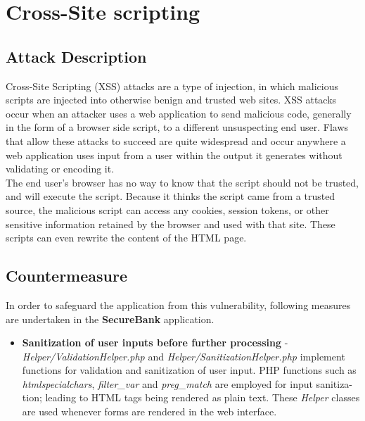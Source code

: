 \section{Cross-Site scripting}

\subsection{Attack Description}
Cross-Site Scripting (XSS) attacks are a type of injection, in which malicious scripts are injected into otherwise benign and trusted web sites. XSS attacks occur when an attacker uses a web application to send malicious code, generally in the form of a browser side script, to a different unsuspecting end user. Flaws that allow these attacks to succeed are quite widespread and occur anywhere a web application uses input from a user within the output it generates without validating or encoding it. \\

The end user’s browser has no way to know that the script should not be trusted, and will execute the script. Because it thinks the script came from a trusted source, the malicious script can access any cookies, session tokens, or other sensitive information retained by the browser and used with that site. These scripts can even rewrite the content of the HTML page.

\subsection{Countermeasure}
In order to safeguard the application from this vulnerability, following measures are undertaken in the \textbf{SecureBank} application.
\begin{itemize}
\item \textbf{Sanitization of user inputs before further processing} -  \textit{Helper/ValidationHelper.php} and \textit{Helper/SanitizationHelper.php} implement functions for validation and sanitization of user input. PHP functions such as \textit{htmlspecialchars}, \textit{filter\_var} and \textit{preg\_match} are employed for input sanitiza-
tion; leading to HTML tags being rendered as plain text. These \textit{Helper} classes are used whenever forms are rendered in the web interface.
\end{itemize}

\clearpage